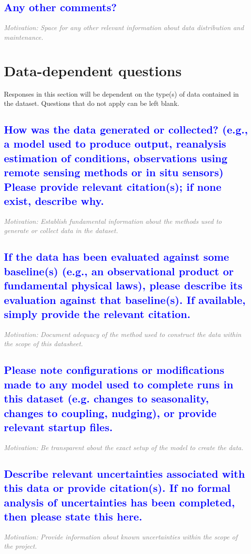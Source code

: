 \documentclass[letterpaper, 10 pt, transmag]{IEEEtran}
\begin{document}
\textcolor{blue}{\subsection{Any other comments?}}
\textcolor{gray}{\textit{Motivation: Space for any other relevant information about data distribution and maintenance.}}
\vspace{10mm}

\section{Data-dependent questions}
Responses in this section will be dependent on the type(s) of data contained in the dataset. Questions that do not apply can be left blank.


\textcolor{blue}{\subsection{How was the data generated or collected? (e.g., a model used to produce output, reanalysis estimation of conditions, observations using remote sensing methods or in situ sensors) Please provide relevant citation(s); if none exist, describe why.}}
\textcolor{gray}{\textit{Motivation: Establish fundamental information about the methods used to generate or collect data in the dataset.}}

\textcolor{blue}{\subsection{If the data has been evaluated against some baseline(s) (e.g., an observational product or fundamental physical laws), please describe its evaluation against that baseline(s). If available, simply provide the relevant citation.}}
\textcolor{gray}{\textit{Motivation: Document adequacy of the method used to construct the data within the scope of this datasheet.}}

\textcolor{blue}{\subsection{Please note configurations or modifications made to any model used to complete runs in this dataset (e.g. changes to seasonality, changes to coupling, nudging), or provide relevant startup files.}}
\textcolor{gray}{\textit{Motivation: Be transparent about the exact setup of the model to create the data.}}

\textcolor{blue}{\subsection{Describe relevant uncertainties associated with this data or provide citation(s). If no formal analysis of uncertainties has been completed, then please state this here.}}
\textcolor{gray}{\textit{Motivation: Provide information about known uncertainties within the scope of the project.}}
\end{document}
